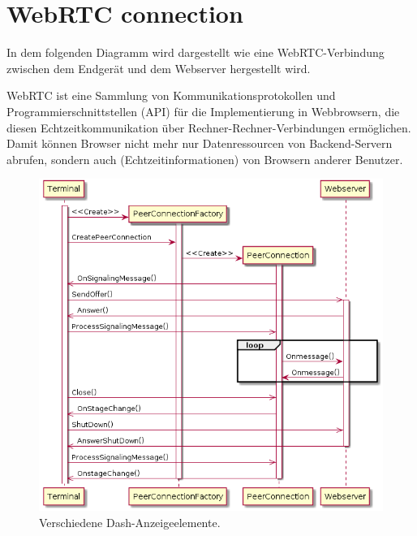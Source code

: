 \documentclass[entwurf.tex]{subfiles}
\begin{document}
  	\section{WebRTC connection}
		In dem folgenden Diagramm wird dargestellt wie eine WebRTC-Verbindung zwischen dem Endgerät und dem Webserver hergestellt wird.
		
		WebRTC ist eine Sammlung von Kommunikationsprotokollen und Programmierschnittstellen (API) für die Implementierung in Webbrowsern, die diesen Echtzeitkommunikation über Rechner-Rechner-Verbindungen ermöglichen. Damit können Browser nicht mehr nur Datenressourcen von Backend-Servern abrufen, sondern auch (Echtzeitinformationen) von Browsern anderer Benutzer.
		
		\begin{figure}[H]
			\begin{center}
	 			\includegraphics[width=\textwidth]{diagrams/DataTransferSequenz.png}
  				\caption{Verschiedene Dash-Anzeigeelemente.}
  			\end{center}
  		\end{figure}
  		
  	\newpage
\end{document}
